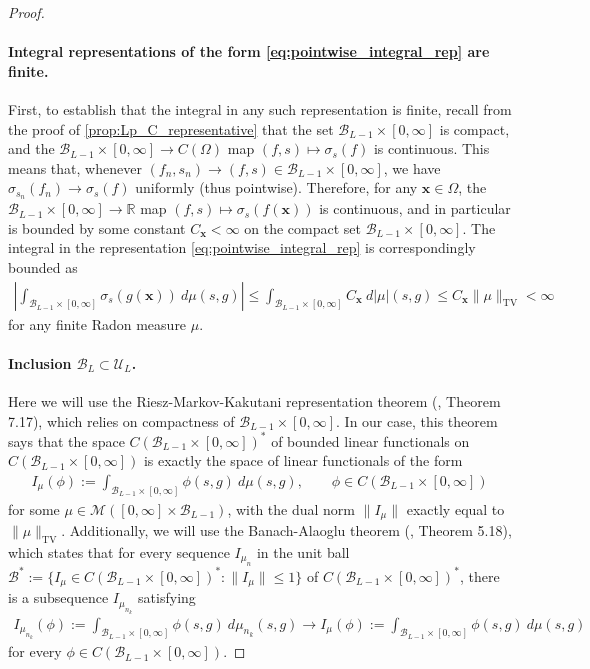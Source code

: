 \documentclass{article}
\DeclareMathOperator{\TV}{TV}
\def\vx{{\bm{x}}}
\def\cB{{\mathcal{B}}}
\def\cM{{\mathcal{M}}}
\def\cU{{\mathcal{U}}}
\newcommand{\R}{\mathbb{R}}
\begin{document}
\begin{appendices}
\begin{proof}
    \paragraph{Integral representations of the form \eqref{eq:pointwise_integral_rep} are finite.} First, to establish that the integral in any such representation is finite, recall from the proof of \cref{prop:Lp_C_representative} that the set $\cB_{L-1} \times [0,\infty]$ is compact, and the $\cB_{L-1} \times [0,\infty] \to C(\Omega)$ map $(f,s) \mapsto \sigma_s(f)$ is continuous. This means that, whenever $(f_n, s_n) \to (f,s) \in \cB_{L-1} \times [0,\infty]$, we have $\sigma_{s_n}(f_n) \to \sigma_s(f)$ uniformly (thus pointwise). Therefore, for any $\vx \in \Omega$, the $\cB_{L-1} \times [0,\infty] \to \R$ map $(f,s) \mapsto \sigma_s(f(\vx))$ is continuous, and in particular is bounded by some constant $C_\vx < \infty$ on the compact set $\cB_{L-1} \times [0,\infty]$. The integral in the representation \eqref{eq:pointwise_integral_rep} is correspondingly bounded as
    \begin{align}
        \left| \int_{\cB_{L-1} \times [0,\infty]} \sigma_s(g(\vx)) \ d \mu(s,g) \right| \leq \int_{\cB_{L-1} \times [0,\infty]} C_\vx \ d |\mu|(s,g) \leq C_\vx \| \mu \|_{\TV} < \infty
    \end{align}
    for any finite Radon measure $\mu$.

    \paragraph{Inclusion $\cB_L \subset \cU_L$.} 

Here we will use the Riesz-Markov-Kakutani representation theorem (\cite{folland1999real}, Theorem 7.17), which relies on compactness of $\cB_{L-1} \times [0,\infty]$. In our case, this theorem says that the space $C(\cB_{L-1} \times [0,\infty])^*$ of bounded linear functionals on $C(\cB_{L-1} \times [0,\infty])$ is exactly the space of linear functionals of the form
\begin{align} 
    I_\mu(\phi) := \int_{\cB_{L-1} \times [0,\infty]} \phi(s,g) \ d \mu(s,g), \qquad \phi \in C( \cB_{L-1} \times [0,\infty])
\end{align}
for some $\mu \in \cM([0,\infty] \times\cB_{L-1})$, with the dual norm $\| I_\mu \|$ exactly equal to $\| \mu \|_{\TV}$. Additionally, we will use the Banach-Alaoglu theorem (\cite{folland1999real}, Theorem 5.18), which states that for every sequence $I_{\mu_n}$ in the unit ball $\cB^* := \{ I_\mu \in C(\cB_{L-1} \times [0,\infty])^*: \| I_\mu \| \leq 1 \}$ of $C(\cB_{L-1} \times [0,\infty])^*$, there is a subsequence $I_{\mu_{n_k}}$ satisfying
\begin{align} \label{eq:weak_star_conv_def}
    I_{\mu_{n_k}}(\phi) := \int_{\cB_{L-1} \times [0,\infty] } \phi(s,g) \ d \mu_{n_k}(s,g) \to I_{\mu}(\phi) := \int_{\cB_{L-1} \times [0,\infty]} \phi(s,g) \ d \mu(s,g) 
\end{align}
for every $\phi \in C(\cB_{L-1} \times [0,\infty])$. 


\end{proof}
\end{appendices}
\end{document}

